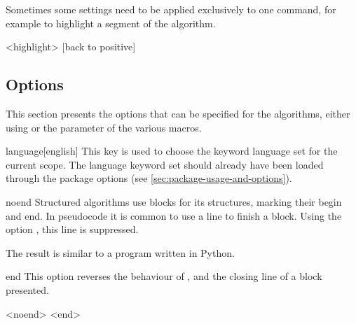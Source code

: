 \documentclass[a4paper, 11pt]{article}
\begin{document}
Sometimes some settings need to be applied exclusively to one command, for example to highlight a segment of the algorithm.

\begin{tcblisting}{}
    \begin{algorithmic}
        <highlight>
            [back to positive]
        \EndIf
    \end{algorithmic}
\end{tcblisting}

\subsection{Options}\label{sec:options}
This section presents the options that can be specified for the algorithms, either using  or the  parameter of the various macros.

\begin{option}{language}{}[english]
    This key is used to choose the keyword language set for the current scope. The language keyword set should already have been loaded through the package options (see \cref{sec:package-usage-and-options}).
\end{option}

\begin{option}{noend}{}
    Structured algorithms use blocks for its structures, marking their begin and end. In pseudocode it is common to use a line to finish a block.
    Using the option , this line is suppressed.

    The result is similar to a program written in Python.
\end{option}

\begin{option}{end}{}
    This option reverses the behaviour of , and the closing line of a block presented.
\end{option}

\begin{tcblisting}{}
    \begin{algorithmic}
        <noend>
                    <end>
                \EndIf
            \EndFor
        \EndFor
    \end{algorithmic}
\end{tcblisting}
\end{document}
